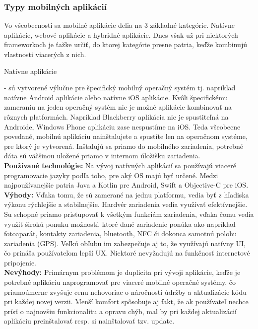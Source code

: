 \subsubsection{Typy mobilných aplikácií}
Vo všeobecnosti sa mobilné aplikácie delia na 3 základné kategórie. Natívne aplikácie, webové aplikácie a hybridné aplikácie. Dnes však už pri niektorých frameworkoch je ťažke určiť, do ktorej kategórie presne patria, keďže kombinujú vlastnosti viacerých z nich. 
\begin{itemize}[leftmargin=*]
{\bf \item Natívne aplikácie} - sú vytvorené výlučne pre špecifický mobilný operačný systém tj. napríklad natívne Android aplikácie alebo natívne iOS aplikácie. Kvôli špecifickému zameraniu na jeden operačný systém nie je možné aplikácie kombinovať na rôznych platformách. Napríklad Blackberry aplikácia nie je spustiteľná na Androide, Windows Phone aplikáciu zase nespustíme na iOS. Teda všeobecne povedané, mobilnú aplikáciu nainštalujete a spustíte len na operačnom systéme, pre ktorý je vytvorená. Inštalujú sa priamo do mobilného zariadenia, potrebné dáta sú väčšinou uložené priamo v internom úložišku zariadenia. \\

{\bf Používané technológie:} Na vývoj natívných aplikácií sa používajú viaceré programovacie jazyky podľa toho, pre aký OS majú byť určené. Medzi najpoužívanejšie patria Java a Kotlin pre Android, Swift a Objective-C pre iOS. \\

{\bf Výhody:} Vďaka tomu, že sú zamerané na jednu platformu, vedia byť z hľadiska výkonu rýchlejšie a stabilnejšie. Hardvér zariadenia vedia využívať efektívnejšie. Su schopné priamo pristupovať k všetkým funkciám zariadenia, vďaka čomu vedia využiť širokú ponuku možností, ktoré dané zariadenie ponúka ako napríklad fotoaparát, kontakty zariadenia, bluetooth, NFC či dokonca samotnú polohu zariadenia (GPS). Veľkú obľubu im zabezpečuje aj to, že využívajú natívny UI, čo prináša používateľom lepší UX. Niektoré nevyžadujú na funkčnosť internetové pripojenie. \\
 
{\bf Nevýhody:}  Primárnym problémom je duplicita pri vývoji aplikácie, keďže je potrebné aplikáciu naprogramovať pre viaceré mobilné operačné systémy, čo priamoúmerne zvyšuje cenu nehovoriac o náročnosti údržby a aktualizácie kódu pri každej novej verzii. Menší komfort spôsobuje aj fakt, že ak používateľ nechce prísť o najnovšiu funkcionalitu a opravu chýb, mal by pri každej aktualizácií aplikáciu preinštalovať resp. si nainštalovať tzv. update. \\


\end{itemize}
